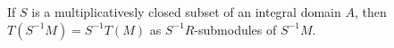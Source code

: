If $S$ is a multiplicativesly closed subset of an integral domain $A$, then
$T(S^{-1}M) = S^{-1}T(M)$ as $S^{-1}R$-submodules of $S^{-1}M$.
